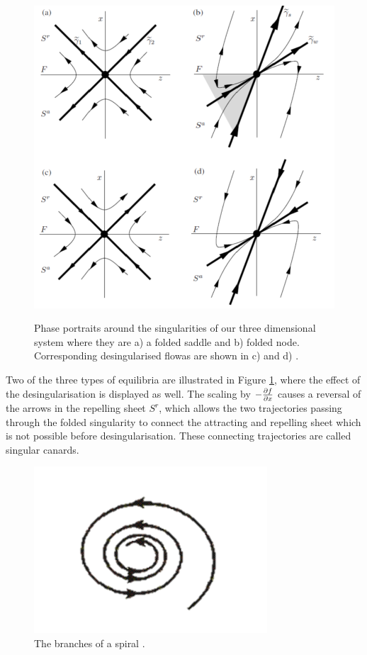 \begin{figure}[h!]\centering
	\includegraphics[height=12cm,width=12cm]{Images/foldednodesetc}
	\caption{Phase portraits around the singularities of our three dimensional system where they are a) a folded saddle and b) folded node. Corresponding desingularised flowas are shown in c) and d) \citep{MMO}.}
	\label{fig: folded singularities}
\end{figure}\newpage%
Two of the three types of equilibria are illustrated in Figure \ref{fig: folded singularities}, where the effect of the desingularisation is displayed as well. The scaling by $-\pd{f}{x}$
causes a reversal of the arrows in the repelling sheet $S^r$, which allows the two trajectories passing through the folded singularity to connect the attracting and repelling sheet which is not possible before desingularisation. These connecting trajectories are called singular canards.


\begin{figure}[h!]\centering
	\includegraphics{Images/spiral3}
	\caption{The branches of a spiral \citep{Spiral}.}
	\label{fig: spiral}
\end{figure}\newpage

